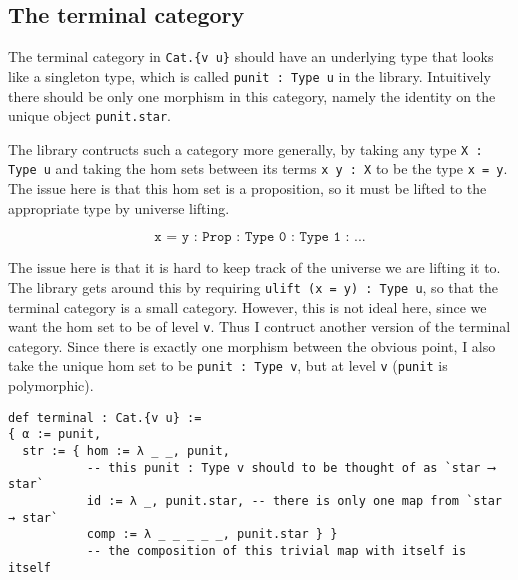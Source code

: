 \documentclass{article}
\newcommand{\<}{\langle}
\renewcommand{\>}{\rangle}
\theoremstyle{definitionstyle}
\theoremstyle{exercisestyle}
\theoremstyle{remarkstyle}
\begin{document}
\subsection{The terminal category}

The terminal category in \texttt{Cat.\{v u\}}
should have an underlying type that looks like a singleton type,
which is called \texttt{punit : Type u} in the library.
Intuitively there should be only one morphism in this category,
namely the identity on the unique object \texttt{punit.star}.

The library contructs such a category more generally,
by taking any type \texttt{X : Type u} and taking the hom
sets between its terms \texttt{x y : X} to be the type \texttt{x = y}.
The issue here is that this hom set is a proposition,
so it must be lifted to the appropriate type by universe lifting.

\[ \texttt{x = y : Prop : Type 0 : Type 1 : ...} \]

The issue here is that it is hard to keep track of the universe we are lifting it to.
The library gets around this by requiring \texttt{ulift (x = y) : Type u},
so that the terminal category is a small category.
However, this is not ideal here, since we want the hom set to be of level \texttt{v}.
Thus I contruct another version of the terminal category.
Since there is exactly one morphism between the obvious point,
I also take the unique hom set to be \texttt{punit : Type v},
but at level \texttt{v} (\texttt{punit} is polymorphic).

\begin{lstlisting}
def terminal : Cat.{v u} :=
{ α := punit,
  str := { hom := λ _ _, punit,
           -- this punit : Type v should to be thought of as `star ⟶ star`
           id := λ _, punit.star, -- there is only one map from `star → star`
           comp := λ _ _ _ _ _, punit.star } }
           -- the composition of this trivial map with itself is itself\end{lstlisting}






{}

\end{document}

